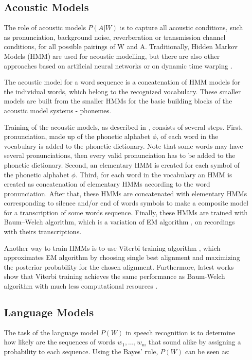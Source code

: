 \subsection{Acoustic Models}
The role of acoustic models $P(A|W)$ is to capture all acoustic conditions,
  such as pronunciation, background noise, reverberation or transmission channel conditions,
  for all possible pairings of W and A.
Traditionally, Hidden Markov Models (HMM) are used for acoustic modelling,
  but there are also other approaches based on artificial neural networks \cite{lippmann1989review} or on dynamic time warping \cite{rabiner1981isolated}.

The acoustic model for a word sequence is a concatenation of HMM models for the individual words,
  which belong to the recognized vocabulary.
These smaller models are built from the smaller HMMs for the basic building blocks of the acoustic model systems - phonemes.

Training of the acoustic models, as described in \cite{frederick1997statistical}, consists of several steps.
First, pronunciation, made up of the phonetic alphabet $\phi$, of each word in the vocabulary is added to the phonetic dictionary.
Note that some words may have several pronunciations,
  then every valid pronunciation has to be added to the phonetic dictionary.
Second, an elementary HMM is created for each symbol of the phonetic alphabet $\phi$.
Third, for each word in the vocabulary an HMM is created as concatenation of elementary HMMs according to the word pronunciation.
After that, these HMMs are concatenated with elementary HMMs corresponding to silence and/or end of words symbols to make a composite model for a transcription of some words sequence.
Finally, these HMMs are trained with Baum--Welch \cite{welch2003hidden} algorithm,
  which is a variation of EM algorithm \cite{dempster1977maximum},
  on recordings with theirs transcriptions.

Another way to train HMMs is to use Viterbi training algorithm \cite{franzini1990connectionist},
  which approximates EM algorithm by choosing single best alignment and maximizing the posterior probability for the chosen alignment.
Furthermore, latest works show that Viterbi training achieves the same performance as Baum-Welch algorithm with much less computational resources \cite{rodriguez2003comparative}.

\subsection{Language Models}
The task of the language model $P(W)$ in speech recognition is
  to determine how likely are the sequences of words $w_1,\dots,w_m$ that sound alike
  by assigning a probability to each sequence.
Using the Bayes' rule, $P(W)$ can be seen as:

